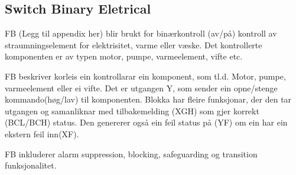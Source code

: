 \newpage

\subsection{Switch Binary Eletrical}

\gls{FB} (Legg til appendix her) blir brukt for binærkontroll (av/på) kontroll av straumningselement for elektrisitet, varme eller væske. Det
kontrollerte komponenten er av typen motor, pumpe, varmeelement, vifte etc.

\gls{FB} beskriver korleis ein kontrollarar ein komponent, som tl.d. Motor, pumpe, varmeelement eller ei vifte.
Det er utgangen Y, som sender ein opne/stenge kommando(høg/lav) til komponenten. Blokka har fleire funksjonar, der den
tar utgangen og samanliknar med tilbakemelding (XGH) som gjer korrekt (BCL/BCH) status. Den genererer også ein feil status på
(YF) om ein har ein ekstern feil inn(XF).

\gls{FB} inkluderer alarm suppression, blocking, safeguarding og transition funksjonalitet.

